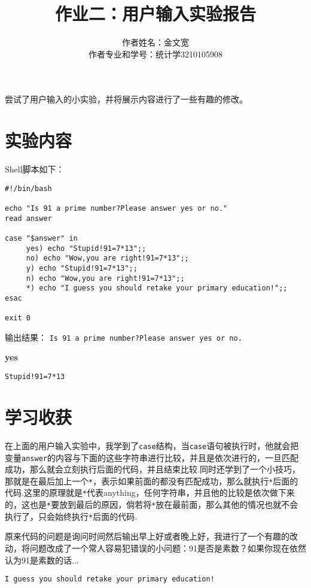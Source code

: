 \documentclass{ctexart}
\title{作业二：用户输入实验报告}
\author{作者姓名：金文宽 \\作者专业和学号：统计学3210105908}
\begin{document}
\maketitle


尝试了用户输入的小实验，并将展示内容进行了一些有趣的修改。
\section{实验内容}
Shell脚本如下：
\begin{verbatim}
#!/bin/bash

echo "Is 91 a prime number?Please answer yes or no."
read answer

case "$answer" in
     yes) echo "Stupid!91=7*13";;
     no) echo "Wow,you are right!91=7*13";;
     y) echo "Stupid!91=7*13";;
     n) echo "Wow,you are right!91=7*13";;
     *) echo "I guess you should retake your primary education!";;
esac

exit 0
\end{verbatim}
输出结果：
\verb|Is 91 a prime number?Please answer yes or no.|

\textbf{yes}

\verb|Stupid!91=7*13|
\section{学习收获}
在上面的用户输入实验中，我学到了\verb|case|结构，当\verb|case|语句被执行时，他就会把变量\verb|answer|的内容与下面的这些字符串进行比较，并且是依次进行的，一旦匹配成功，那么就会立刻执行后面的代码，并且结束比较.同时还学到了一个小技巧，那就是在最后加上一个\verb|*|，表示如果前面的都没有匹配成功，那么就执行\verb|*|后面的代码.这里的原理就是\verb|*|代表anything，任何字符串，并且他的比较是依次做下来的，这也是\verb|*|要放到最后的原因，倘若将\verb|*|放在最前面，那么其他的情况也就不会执行了，只会始终执行\verb|*|后面的代码.

原来代码的问题是询问时间然后输出早上好或者晚上好，我进行了一个有趣的改动，将问题改成了一个常人容易犯错误的小问题：91是否是素数？如果你现在依然认为91是素数的话...

\verb|I guess you should retake your primary education!|
\end{document}
